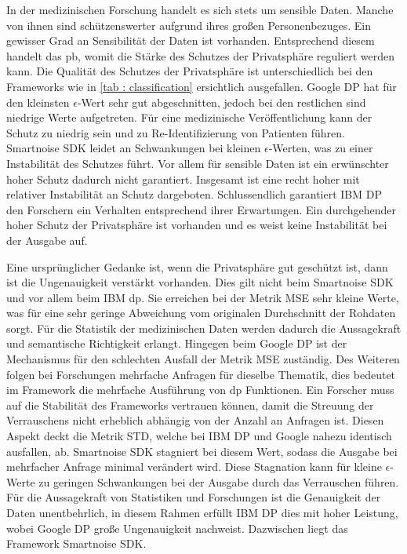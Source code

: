In der medizinischen Forschung handelt es sich stets um sensible Daten. Manche von ihnen sind schützenswerter aufgrund ihres großen Personenbezuges. Ein gewisser Grad an Sensibilität der Daten ist vorhanden. Entsprechend diesem handelt das \gls{pb}, womit die Stärke des Schutzes der Privatsphäre reguliert werden kann. Die Qualität des Schutzes der Privatsphäre ist unterschiedlich bei den Frameworks wie in \cref{tab : classification} ersichtlich ausgefallen. Google DP hat für den kleinsten $\epsilon$-Wert sehr gut abgeschnitten, jedoch bei den restlichen sind niedrige Werte aufgetreten. Für eine medizinische Veröffentlichung kann der Schutz zu niedrig sein und zu Re-Identifizierung von Patienten führen. Smartnoise SDK leidet an Schwankungen bei kleinen $\epsilon$-Werten, was zu einer Instabilität des Schutzes führt. Vor allem für sensible Daten ist ein erwünschter hoher Schutz dadurch nicht garantiert. Insgesamt ist eine recht hoher mit relativer Instabilität an Schutz dargeboten. Schlussendlich garantiert IBM DP den Forschern ein Verhalten entsprechend ihrer Erwartungen. Ein durchgehender hoher Schutz der Privatsphäre ist vorhanden und es weist keine Instabilität bei der Ausgabe auf.

Eine ursprünglicher Gedanke ist, wenn die Privatsphäre gut geschützt ist, dann ist die Ungenauigkeit verstärkt vorhanden. Dies gilt nicht beim Smartnoise SDK und vor allem beim IBM \gls{dp}. Sie erreichen bei der Metrik MSE sehr kleine Werte, was für eine sehr geringe Abweichung vom originalen Durchschnitt der Rohdaten sorgt. Für die Statistik der medizinischen Daten werden dadurch die Aussagekraft und semantische Richtigkeit erlangt. Hingegen beim Google DP ist der Mechanismus für den schlechten Ausfall der Metrik MSE zuständig. Des Weiteren folgen bei Forschungen mehrfache Anfragen für dieselbe Thematik, dies bedeutet im Framework die mehrfache Ausführung von \gls{dp} Funktionen. Ein Forscher muss auf die Stabilität des Frameworks vertrauen können, damit die Streuung der Verrauschens nicht erheblich abhängig von der Anzahl an Anfragen ist. Diesen Aspekt deckt die Metrik STD, welche bei IBM DP und Google nahezu identisch ausfallen, ab. Smartnoise SDK stagniert bei diesem Wert, sodass die Ausgabe bei mehrfacher Anfrage minimal verändert wird. Diese Stagnation kann für kleine $\epsilon$-Werte zu geringen Schwankungen bei der Ausgabe durch das Verrauschen führen. Für die Aussagekraft von Statistiken und Forschungen ist die Genauigkeit der Daten unentbehrlich, in diesem Rahmen erfüllt IBM DP dies mit hoher Leistung, wobei Google DP große Ungenauigkeit nachweist. Dazwischen liegt das Framework Smartnoise SDK.

